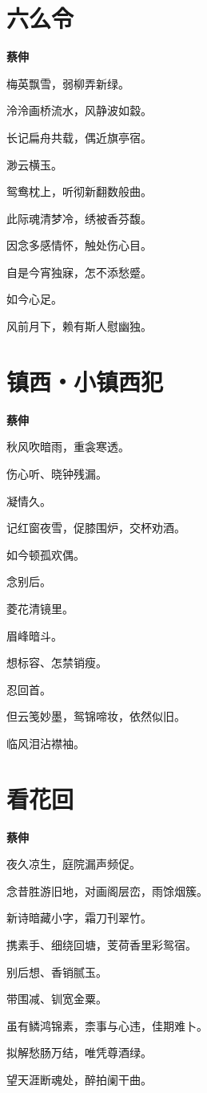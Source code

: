 \documentclass[12pt,a4paper]{ctexbook}
\begin{document}
\section{六么令}
\textbf{蔡伸}\par\vspace{0.5em}
梅英飘雪，弱柳弄新绿。\par
泠泠画桥流水，风静波如縠。\par
长记扁舟共载，偶近旗亭宿。\par
渺云横玉。\par
鸳鸯枕上，听彻新翻数般曲。\par
此际魂清梦冷，绣被香芬馥。\par
因念多感情怀，触处伤心目。\par
自是今宵独寐，怎不添愁蹙。\par
如今心足。\par
风前月下，赖有斯人慰幽独。\par

\section{镇西・小镇西犯}
\textbf{蔡伸}\par\vspace{0.5em}
秋风吹暗雨，重衾寒透。\par
伤心听、晓钟残漏。\par
凝情久。\par
记红窗夜雪，促膝围炉，交杯劝酒。\par
如今顿孤欢偶。\par
念别后。\par
菱花清镜里。\par
眉峰暗斗。\par
想标容、怎禁销瘦。\par
忍回首。\par
但云笺妙墨，鸳锦啼妆，依然似旧。\par
临风泪沾襟袖。\par

\section{看花回}
\textbf{蔡伸}\par\vspace{0.5em}
夜久凉生，庭院漏声频促。\par
念昔胜游旧地，对画阁层峦，雨馀烟簇。\par
新诗暗藏小字，霜刀刊翠竹。\par
携素手、细绕回塘，芰荷香里彩鸳宿。\par
别后想、香销腻玉。\par
带围减、钏宽金粟。\par
虽有鳞鸿锦素，柰事与心违，佳期难卜。\par
拟解愁肠万结，唯凭尊酒绿。\par
望天涯断魂处，醉拍阑干曲。\par
\end{document}
